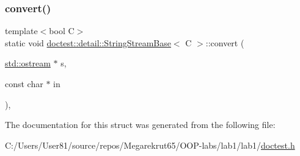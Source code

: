 \mbox{\label{structdoctest_1_1detail_1_1_string_stream_base_a7c248639907b26e46344b91d7ab90be7}} 
\subsubsection{\texorpdfstring{convert()}{convert()}\hspace{0.1cm}{\footnotesize\ttfamily [2/2]}}
{\footnotesize\ttfamily template$<$bool C$>$ \\
static void \mbox{\hyperlink{structdoctest_1_1detail_1_1_string_stream_base}{doctest\+::detail\+::\+String\+Stream\+Base}}$<$ C $>$\+::convert (\begin{DoxyParamCaption}\item[{\mbox{\hyperlink{doctest_8h_a116af65cb5e924b33ad9d9ecd7a783f3}{std\+::ostream}} $\ast$}]{s,  }\item[{const char $\ast$}]{in }\end{DoxyParamCaption})\hspace{0.3cm}{\ttfamily [inline]}, {\ttfamily [static]}}



The documentation for this struct was generated from the following file\+:\begin{DoxyCompactItemize}
\item 
C\+:/\+Users/\+User81/source/repos/\+Megarekrut65/\+O\+O\+P-\/labs/lab1/lab1/\mbox{\hyperlink{doctest_8h}{doctest.\+h}}\end{DoxyCompactItemize}
